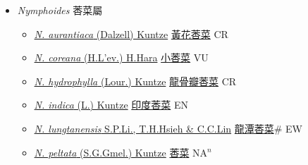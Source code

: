 
  \begin{itemize}
 \item[] \textit{Nymphoides} 莕菜屬
                    
  \begin{itemize}
        \item[] \href{http://www.theplantlist.org/tpl1.1/search?q=Nymphoides+aurantiaca}{\textit{N. aurantiaca} (Dalzell) Kuntze}   \href{\detokenize{http://taibnet.sinica.edu.tw/chi/taibnet_species_list.php?T2=黃花莕菜&T2_new_value=true&fr=y}}{黃花莕菜} CR
        \item[] \href{http://www.theplantlist.org/tpl1.1/search?q=Nymphoides+coreana}{\textit{N. coreana} (H.L'ev.) H.Hara}   \href{\detokenize{http://taibnet.sinica.edu.tw/chi/taibnet_species_list.php?T2=小莕菜&T2_new_value=true&fr=y}}{小莕菜} VU
        \item[] \href{http://www.theplantlist.org/tpl1.1/search?q=Nymphoides+hydrophylla}{\textit{N. hydrophylla} (Lour.) Kuntze}   \href{\detokenize{http://taibnet.sinica.edu.tw/chi/taibnet_species_list.php?T2=龍骨瓣莕菜&T2_new_value=true&fr=y}}{龍骨瓣莕菜} CR
        \item[] \href{http://www.theplantlist.org/tpl1.1/search?q=Nymphoides+indica}{\textit{N. indica} (L.) Kuntze}   \href{\detokenize{http://taibnet.sinica.edu.tw/chi/taibnet_species_list.php?T2=印度莕菜&T2_new_value=true&fr=y}}{印度莕菜} EN
        \item[] \href{http://www.theplantlist.org/tpl1.1/search?q=Nymphoides+lungtanensis}{\textit{N. lungtanensis} S.P.Li., T.H.Hsieh \& C.C.Lin}   \href{\detokenize{http://taibnet.sinica.edu.tw/chi/taibnet_species_list.php?T2=龍潭莕菜&T2_new_value=true&fr=y}}{龍潭莕菜}\# EW
        \item[] \href{http://www.theplantlist.org/tpl1.1/search?q=Nymphoides+peltata}{\textit{N. peltata} (S.G.Gmel.) Kuntze}   \href{\detokenize{http://taibnet.sinica.edu.tw/chi/taibnet_species_list.php?T2=莕菜&T2_new_value=true&fr=y}}{莕菜} NA$^n$
  \end{itemize}
  \end{itemize}
